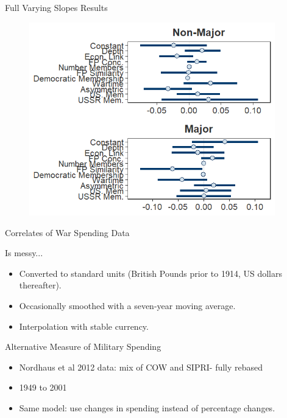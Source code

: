 \documentclass[12pt]{beamer}
\begin{document}

\begin{frame}{Full Varying Slopes Results}

\begin{figure}[htbp]
	\centering
		\includegraphics[width=0.95\textwidth]{vs-res-full.png}
\end{figure}

\end{frame}



\begin{frame}{Correlates of War Spending Data}

Is messy... 

\begin{itemize}
\item Converted to standard units (British Pounds prior to 1914, US dollars thereafter). 
\item Occasionally smoothed with a seven-year moving average.
\item Interpolation with stable currency.
\end{itemize} 


\end{frame}



\begin{frame}{Alternative Measure of Military Spending}


\begin{itemize} 
\item Nordhaus et al 2012 data: mix of COW and SIPRI- fully rebased
\item 1949 to 2001
\item Same model: use changes in spending instead of percentage changes. 
\end{itemize}

\end{frame}
\end{document}
